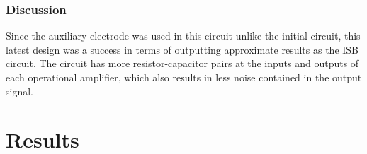 \subsection{Discussion}
Since the auxiliary electrode was used in this circuit unlike the initial circuit, this latest design was a success in terms of outputting approximate results as the ISB circuit. The circuit has more resistor-capacitor pairs at the inputs and outputs of each operational amplifier, which also results in less noise contained in the output signal.

\chapter{Results}






